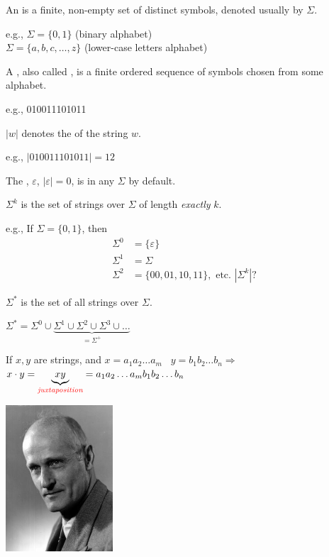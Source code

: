 \begin{frame}
An  is a finite, non-empty set of
distinct symbols, denoted usually by $\Sigma$.

e.g., $\Sigma=\{0,1\}$ (binary alphabet) \\
$\Sigma=\{a,b,c,\ldots,z\}$ (lower-case letters alphabet)

A , also called , is a finite
ordered sequence of symbols chosen from some alphabet.

e.g., 010011101011

$|w|$ denotes the  of the string $w$.

e.g., $|010011101011|=12$

The , $\varepsilon$,
$|\varepsilon|=0$, is in any $\Sigma$ by default.
\end{frame}

\begin{frame}
$\Sigma^k$ is the set of strings over $\Sigma$ of length {\em exactly}
$k$.  

e.g., If $\Sigma=\{0,1\}$, then 
\begin{align*}
\Sigma^0 &=\{\varepsilon\} \\
\Sigma^1 &=\Sigma \\
\Sigma^2 &=\{00,01,10,11\}, \text{ etc. } 
|\Sigma^k|?
\end{align*}

  $\Sigma^*$ is the set of all strings over
$\Sigma$.  

$\Sigma^*=\Sigma^0\cup
\underbrace{\Sigma^1\cup\Sigma^2\cup\Sigma^3\cup\ldots}_{=\Sigma^+}$

  If $x,y$ are strings, and
$x=a_1a_2\ldots a_m$ \amp\ $y=b_1b_2\ldots b_n \Rightarrow$
$x\cdot y=\underbrace{xy}_{\text{\textcolor{red}{\em juxtaposition}}}
=a_1a_2\ldots a_mb_1b_2\ldots b_n$
\end{frame}

\begin{frame}
\begin{minipage}{5cm}
\includegraphics[width=4cm]{figures/StephenKleene.jpg}
\end{minipage}
\begin{minipage}{5cm}
 \\
\end{minipage}
\end{frame}

